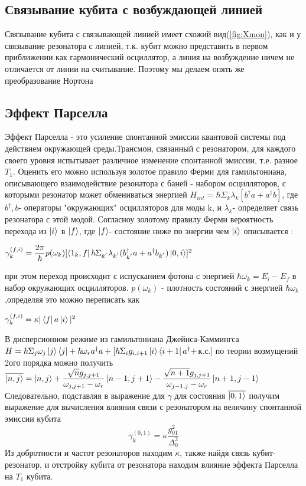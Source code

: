 \documentclass[12pt, a4paper, openany]{book}
\begin{document}
	\subsection{Связывание кубита с возбуждающей линией}
	Связывание кубита с связывающей линией имеет схожий вид(\ref{fig:Xmon}), как и у связывание резонатора с линией, т.к. кубит можно представить в первом приближении как гармонический осциллятор, а линия на возбуждение ничем не отличается от линии на считывание. Поэтому мы делаем опять же преобразование Нортона
	\subsection{Эффект Парселла}
Эффект Парселла\cite{Koch2007} - это усиление спонтанной эмиссии квантовой системы под действием окружающей среды.Трансмон, связанный с резонатором, для каждого своего уровня испытывает различное изменение спонтанной эмиссии, т.е. разное $T_1$. Оценить его можно используя золотое правило Ферми для гамильтониана, описывающего взаимодействие резонатора с баней - набором осцилляторов, с которыми резонатор может обмениваться энергией $H_{int}=\hbar\Sigma_k \lambda_k [b^{\dagger}a+a^{\dagger}b]$, где $b^{\dagger},b$-
операторы "окружающих" осцилляторов для моды k, и $\lambda_k$- определяет связь резонатора с этой модой. Согласноу золотому правилу Ферми вероятность перехода из $\ket{i}$ в $\ket{f}$, где $\ket{f}$- состояние ниже по энергии чем $\ket{i}$  описывается :
\begin{center}
$
\gamma^{(f,i)}_k=\dfrac{2\pi}{\hbar}
p(\omega_k)[\bra{1_k,f}\hbar\Sigma_{k^{'}} \lambda_{k^{'}}
(b^{\dagger}_{k^{'}}a+a^{\dagger}b_{k^{'}})\ket{0,i}]^2
$
\end{center}
при этом переход происходит с испусканием фотона с энергией 
$\hbar\omega_k = E_i - E_f$ в набор окружающих осцилляторов.
$p(\omega_k)$ - плотность состояний с энергией $\hbar \omega_k$ ,определяя  это можно переписать как
\begin{center}
$\gamma^{(f,i)}_k=\kappa|\bra{f}a\ket{i}|^2$
\end{center}
В дисперсионном режиме из гамильтониана Джейнса-Каммингса
$
H=\hbar \Sigma_j \omega_j \ket{j}\bra{j} + \hbar \omega_r 
a^{\dagger} a +[\hbar \Sigma_i g_{i,i+1}\ket{i}\bra{i+1}a^{\dagger}+$к.с.$]$ по теории возмущений 2ого порядка можно получить
$
\overline{\ket{n,j}} = \ket{n,j} + \dfrac{\sqrt{n}g_{j,j+1}}{\omega_{j,j+1}-\omega_r}\ket{n-1,j+1}-
\dfrac{\sqrt{n+1}g_{j,j+1}}{\omega_{j-1,j}-\omega_r}\ket{n+1,j-1} 
$
Следовательно, подставляя в выражение для $\gamma$ для состояния $\overline{\ket{0,1}}$ получим выражение для вычисления влияния связи с резонатором на величину спонтанной эмиссии кубита
\begin{equation}
\gamma^{(0,1)}_k=\kappa \dfrac{g^2_{01}}{\Delta_0^2}
\label{eq:Purcell}
\end{equation}
Из добротности и частот резонаторов находим $\kappa$,  также  найдя связь кубит-резонатор, и отстройку кубита от резонатора находим влияние эффекта Парселла на $T_1$ кубита.
\end{document}
